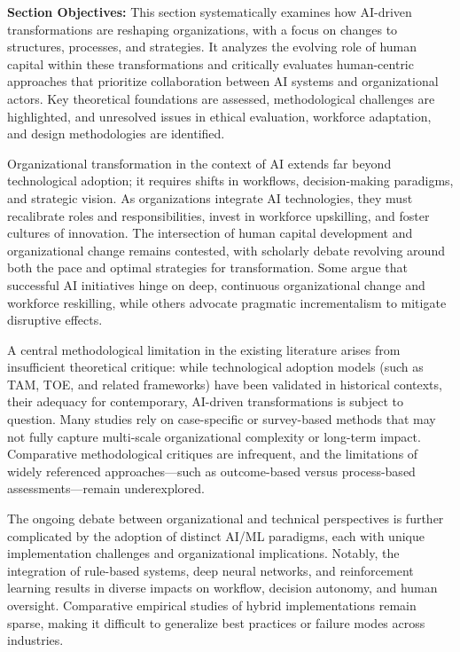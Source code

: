 \documentclass[sigconf]{acmart}
\begin{document}
\textbf{Section Objectives:} This section systematically examines how AI-driven transformations are reshaping organizations, with a focus on changes to structures, processes, and strategies. It analyzes the evolving role of human capital within these transformations and critically evaluates human-centric approaches that prioritize collaboration between AI systems and organizational actors. Key theoretical foundations are assessed, methodological challenges are highlighted, and unresolved issues in ethical evaluation, workforce adaptation, and design methodologies are identified.

Organizational transformation in the context of AI extends far beyond technological adoption; it requires shifts in workflows, decision-making paradigms, and strategic vision. As organizations integrate AI technologies, they must recalibrate roles and responsibilities, invest in workforce upskilling, and foster cultures of innovation. The intersection of human capital development and organizational change remains contested, with scholarly debate revolving around both the pace and optimal strategies for transformation. Some argue that successful AI initiatives hinge on deep, continuous organizational change and workforce reskilling, while others advocate pragmatic incrementalism to mitigate disruptive effects.

A central methodological limitation in the existing literature arises from insufficient theoretical critique: while technological adoption models (such as TAM, TOE, and related frameworks) have been validated in historical contexts, their adequacy for contemporary, AI-driven transformations is subject to question. Many studies rely on case-specific or survey-based methods that may not fully capture multi-scale organizational complexity or long-term impact. Comparative methodological critiques are infrequent, and the limitations of widely referenced approaches—such as outcome-based versus process-based assessments—remain underexplored.

The ongoing debate between organizational and technical perspectives is further complicated by the adoption of distinct AI/ML paradigms, each with unique implementation challenges and organizational implications. Notably, the integration of rule-based systems, deep neural networks, and reinforcement learning results in diverse impacts on workflow, decision autonomy, and human oversight. Comparative empirical studies of hybrid implementations remain sparse, making it difficult to generalize best practices or failure modes across industries.
\end{document}
